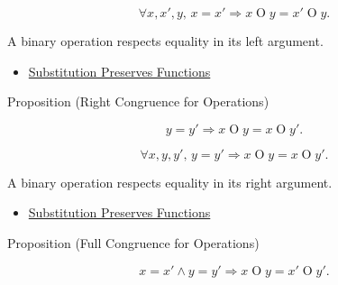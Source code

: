 \begin{remark*}
\[
\forall x,x',y,\,
x=x' \Longrightarrow x\mathbin{O}y=x'\mathbin{O}y.
\]
\end{remark*}

\begin{remark*}[Interpretation]
A binary operation respects equality in its left argument.
\end{remark*}

\begin{dependencies}
\begin{itemize}
  \item \hyperref[prop:substitution-preserves-functions]{Substitution Preserves Functions}
\end{itemize}
\end{dependencies}

\begin{propositionbox}{Proposition (Right Congruence for Operations)}
\begin{proposition}
\label{prop:substitution-preserves-operations-right}
\[
y=y' \Longrightarrow x\mathbin{O}y=x\mathbin{O}y'.
\]
\end{proposition}
\end{propositionbox}

\begin{remark*}
\[
\forall x,y,y',\,
y=y' \Longrightarrow x\mathbin{O}y=x\mathbin{O}y'.
\]
\end{remark*}

\begin{remark*}[Interpretation]
A binary operation respects equality in its right argument.
\end{remark*}

\begin{dependencies}
\begin{itemize}
  \item \hyperref[prop:substitution-preserves-functions]{Substitution Preserves Functions}
\end{itemize}
\end{dependencies}

\begin{propositionbox}{Proposition (Full Congruence for Operations)}
\begin{proposition}
\label{prop:substitution-preserves-operations-full}
\[
x=x' \land y=y' \Longrightarrow x\mathbin{O}y=x'\mathbin{O}y'.
\]
\end{proposition}
\end{propositionbox}

